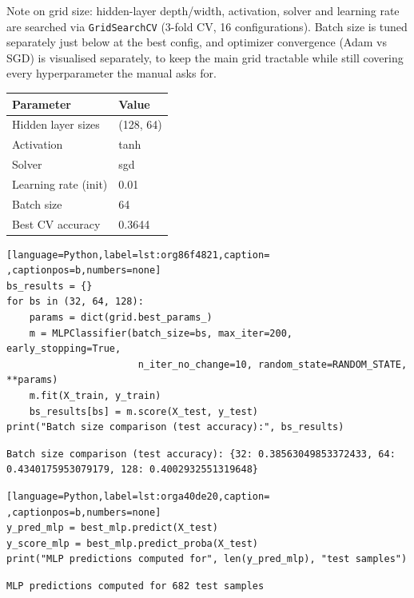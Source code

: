 \documentclass[11pt]{article}
\begin{document}
Note on grid size: hidden-layer depth/width, activation, solver and learning rate are
searched via \texttt{GridSearchCV} (3-fold CV, 16 configurations). Batch size is tuned separately
just below at the best config, and optimizer convergence (Adam vs SGD) is visualised
separately, to keep the main grid tractable while still covering every hyperparameter the
manual asks for.

\begin{center}
\begin{tabular}{ll}
\hline
Parameter & Value\\[0pt]
\hline
Hidden layer sizes & (128, 64)\\[0pt]
Activation & tanh\\[0pt]
Solver & sgd\\[0pt]
Learning rate (init) & 0.01\\[0pt]
Batch size & 64\\[0pt]
Best CV accuracy & 0.3644\\[0pt]
\hline
\end{tabular}
\end{center}

\begin{lstlisting}[language=Python,label=lst:org86f4821,caption= ,captionpos=b,numbers=none]
bs_results = {}
for bs in (32, 64, 128):
    params = dict(grid.best_params_)
    m = MLPClassifier(batch_size=bs, max_iter=200, early_stopping=True,
                       n_iter_no_change=10, random_state=RANDOM_STATE, **params)
    m.fit(X_train, y_train)
    bs_results[bs] = m.score(X_test, y_test)
print("Batch size comparison (test accuracy):", bs_results)
\end{lstlisting}

\begin{verbatim}
Batch size comparison (test accuracy): {32: 0.38563049853372433, 64: 0.4340175953079179, 128: 0.4002932551319648}
\end{verbatim}


\begin{lstlisting}[language=Python,label=lst:orga40de20,caption= ,captionpos=b,numbers=none]
y_pred_mlp = best_mlp.predict(X_test)
y_score_mlp = best_mlp.predict_proba(X_test)
print("MLP predictions computed for", len(y_pred_mlp), "test samples")
\end{lstlisting}

\begin{verbatim}
MLP predictions computed for 682 test samples
\end{verbatim}
\end{document}

